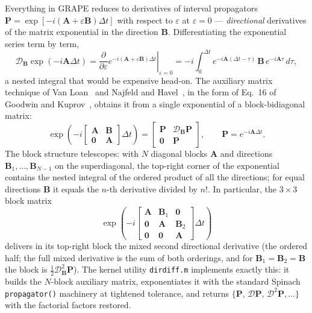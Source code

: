 \documentclass[11pt,a4paper]{article}
\newcommand{\code}[1]{\texttt{#1}}
\begin{document}
Everything in GRAPE reduces to derivatives of interval propagators
$\mathbf{P}=\exp[-i(\mathbf{A}+\varepsilon\mathbf{B})\Delta t]$ with
respect to $\varepsilon$ at $\varepsilon=0$ --- \emph{directional}
derivatives of the matrix exponential in the direction $\mathbf{B}$.
Differentiating the exponential series term by term,
\begin{equation}
  \mathcal{D}_{\mathbf{B}}\exp(-i\mathbf{A}\Delta t)
  =\left.\frac{\partial}{\partial\varepsilon}
   e^{-i(\mathbf{A}+\varepsilon\mathbf{B})\Delta t}\right|_{\varepsilon=0}
  =-i\!\int_0^{\Delta t}
   e^{-i\mathbf{A}(\Delta t-\tau)}\,\mathbf{B}\,
   e^{-i\mathbf{A}\tau}\,d\tau,
  \label{eq:duhamel}
\end{equation}
a nested integral that would be expensive head-on. The auxiliary matrix
technique of Van Loan~\cite{vanloan1978} and Najfeld and
Havel~\cite{najfeld1995}, in the form of Eq.~16 of Goodwin and
Kuprov~\cite{goodwin2015}, obtains it from a single exponential of a
block-bidiagonal matrix:
\begin{equation}
  \exp\!\left(-i
  \begin{bmatrix}
    \mathbf{A} & \mathbf{B}\\
    \mathbf{0} & \mathbf{A}
  \end{bmatrix}\Delta t\right)
  =
  \begin{bmatrix}
    \mathbf{P} & \mathcal{D}_{\mathbf{B}}\mathbf{P}\\
    \mathbf{0} & \mathbf{P}
  \end{bmatrix},
  \qquad \mathbf{P}=e^{-i\mathbf{A}\Delta t}.
  \label{eq:auxmat2}
\end{equation}
The block structure telescopes: with $N$ diagonal blocks $\mathbf{A}$ and
directions $\mathbf{B}_1,\ldots,\mathbf{B}_{N-1}$ on the superdiagonal,
the top-right corner of the exponential contains the nested integral of
the ordered product of all the directions; for equal directions
$\mathbf{B}$ it equals the $n$-th derivative divided by $n!$. In
particular, the $3\times3$ block matrix
\begin{equation}
  \exp\!\left(-i
  \begin{bmatrix}
    \mathbf{A} & \mathbf{B}_1 & \mathbf{0}\\
    \mathbf{0} & \mathbf{A}   & \mathbf{B}_2\\
    \mathbf{0} & \mathbf{0}   & \mathbf{A}
  \end{bmatrix}\Delta t\right)
\end{equation}
delivers in its top-right block the mixed second directional derivative
(the ordered half; the full mixed derivative is the sum of both orderings,
and for $\mathbf{B}_1{=}\mathbf{B}_2{=}\mathbf{B}$ the block is
$\tfrac{1}{2}\mathcal{D}^2_{\mathbf{B}}\mathbf{P}$). The kernel utility
\code{dirdiff.m} implements exactly this: it builds the $N$-block
auxiliary matrix, exponentiates it with the standard Spinach
\code{propagator()} machinery at tightened tolerance, and returns
$\{\mathbf{P},\,\mathcal{D}\mathbf{P},\,\mathcal{D}^2\mathbf{P},\ldots\}$
with the factorial factors restored.
\end{document}
